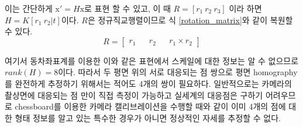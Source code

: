 \documentclass[master,korean,final]{cbnu-ecs}
\begin{document}
이는 간단하게 $\mathrm{x}'=H\mathrm{x}$로 표현 할 수 있고, 이 때 $R=[r_1 \ r_2 \ r_3]$ 이라 하면 $H=K[r_{1} \  r_{2}|t]$이다.
$R$은 정규직교행렬이므로 식 \eqref{rotation_matrix}와 같이 복원할 수 있다.
\begin{equation}
R=\begin{bmatrix}r_1 && r_2 && r_1\times r_2\end{bmatrix} 
\label{rotation_matrix}
\end{equation}

여기서 동차좌표계를 이용한 이와 같은 표현에서 스케일에 대한 정보는 알 수 없으므로 $rank(H)=8$이다. 따라서 두 평면 위의 서로 대응되는 점 쌍으로 평면 homography를 완전하게 추정하기 위해서는 적어도 4개의 쌍이 필요하다. 일반적으로는 카메라의 촬상면에 대응되는 점 만이 직접 측정이 가능하고 실세계의 대응점은 구하기 어려우므로 chessboard를 이용한 카메라 캘리브레이션을 수행할 때와 같이 이미 4개의 점에 대한 형태 정보를 알고 있는 특수한 경우가 아니면 정상적인 자세를 추정할 수 없다.
\end{document}
